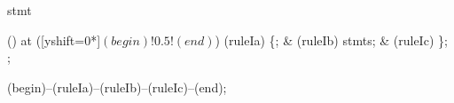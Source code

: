 \begin{syntax}{stmt}
  
  \node[sequence] () at ([yshift=0*\syntaxruledist]$(begin)!0.5!(end)$) {
    \node[terminal]    (ruleIa) {\{};
    &
    \node[nonterminal] (ruleIb) {stmts};
    &
    \node[terminal]    (ruleIc) {\}};
    \\
  };
  
  \draw[path] (begin)--(ruleIa)--(ruleIb)--(ruleIc)--(end);
\end{syntax}
